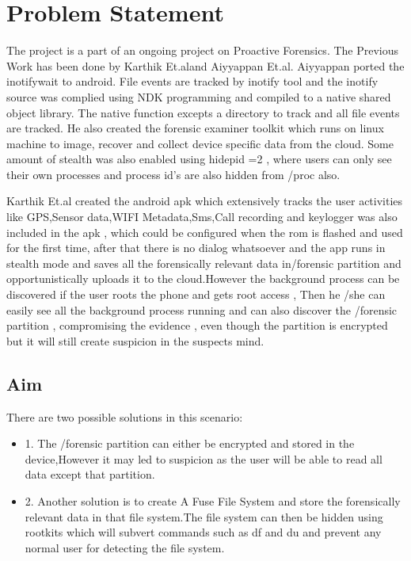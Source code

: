 \chapter{Problem Statement}
\label{chap:problem statement}

The project is a part of an ongoing project on Proactive Forensics. The Previous Work has been done by Karthik Et.al\cite{Karthik2016}and Aiyyappan Et.al\cite{Aiyyappan2015}. Aiyyappan ported the inotifywait to android. File events are tracked by inotify tool and the inotify source was complied using NDK programming and compiled to a native shared object library. The native function excepts a directory to track and all file events are tracked. He also created the forensic examiner toolkit which runs on linux machine to image, recover and collect device specific data from the cloud. Some amount of stealth was also enabled using hidepid =2 , where users can only see their own processes and process id's are also hidden from /proc also.

Karthik Et.al created the android apk which extensively tracks the user activities like GPS,Sensor data,WIFI Metadata,Sms,Call recording and keylogger was also included in the apk , which could be configured when the rom is flashed and used for the first time, after that there is no dialog whatsoever and the app runs in stealth mode and saves all the forensically relevant data in/forensic partition and opportunistically uploads it to the cloud.However the background process can be discovered if the user roots the phone and gets root access , Then he /she can easily see all the background process running and can also discover the /forensic partition , compromising the evidence , even though the partition is encrypted but it will still create suspicion in the suspects mind. 
\newpage
\section{Aim}
There are two possible solutions in this scenario:\\
\begin{itemize}
\item 1. The /forensic partition can either be encrypted and stored in the device,However it may led to suspicion as the user will be able to read all data except that partition.\\

\item 2. Another solution is to create A Fuse File System and store the forensically relevant data in that file system.The file system can then be hidden using rootkits which will subvert commands such as df and du and prevent any normal user for detecting the file system.

\end{itemize}
\bigskip

